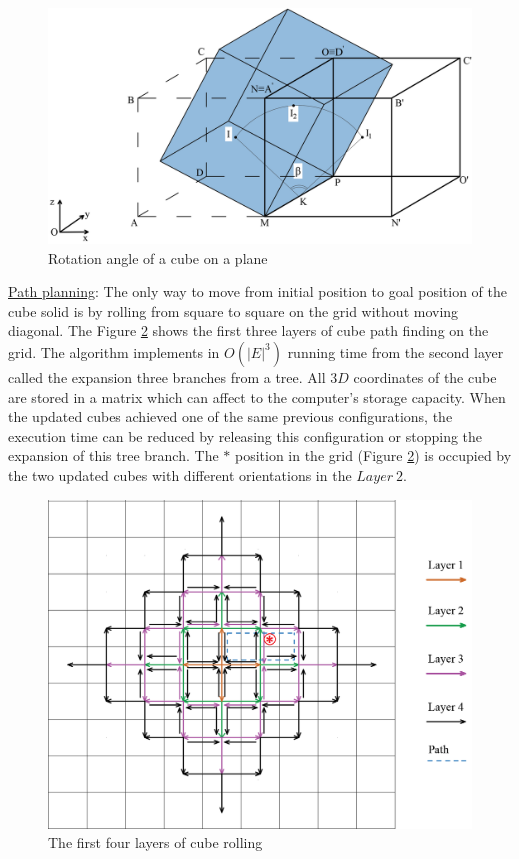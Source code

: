 \begin{figure}[H]
\centering
	\includegraphics[width=1\textwidth]{image/cubeGeo1.png}
	\caption{Rotation angle of a cube on a plane}
	\label{fig:cubeGeo1}
\end{figure}

\noindent\uline{Path planning}: 
The only way to move from initial position to goal position of the cube solid is by rolling from square to square on the grid without moving diagonal. 
The Figure \ref{fig:cubePath0} shows the first three layers of cube path finding on the grid. 
The algorithm implements in $O(|E|^3)$ running time from the second layer called the expansion three branches from a tree. 
All $3D$ coordinates of the cube are stored in a matrix which can affect to the computer's storage capacity. 
When the updated cubes achieved one of the same previous configurations, the execution time can be reduced by releasing this configuration or stopping the expansion of this tree branch.
The $*$ position in the grid (Figure \ref{fig:cubePath0}) is occupied by the two updated cubes with different orientations in the $Layer\ 2$. 

\begin{figure}[H]
\centering
	\includegraphics[width=1\textwidth]{image/cubePath00.png}
	\caption{The first four layers of cube rolling}
	\label{fig:cubePath0}
\end{figure}


